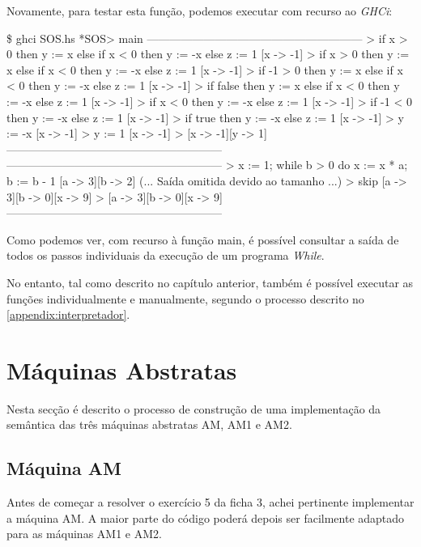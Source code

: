 \documentclass[11pt,a4paper]{report}
\newcommand{\while}[0]{\textit{While}\xspace}
\newcommand{\ghci}[0]{\textit{GHCi}\xspace}
\begin{document}
\par Novamente, para testar esta função, podemos executar com recurso ao \ghci:
\begin{mintedhaskell}{\$ ghci SOS.hs}
*SOS> main
---------------------------------------------------------
> if x > 0 then y := x else if x < 0 then y := -x else z := 1 [x -> -1]
> if x > 0 then {y := x} else {if x < 0 then {y := -x} else {z := 1}}
  [x -> -1]
> if -1 > 0 then {y := x} else {if x < 0 then {y := -x} else {z := 1}}
  [x -> -1]
> if false then {y := x} else {if x < 0 then {y := -x} else {z := 1}}
  [x -> -1]
> if x < 0 then {y := -x} else {z := 1}
  [x -> -1]
> if -1 < 0 then {y := -x} else {z := 1}
  [x -> -1]
> if true then {y := -x} else {z := 1}
  [x -> -1]
> y := -x
  [x -> -1]
> y := 1
  [x -> -1]
> [x -> -1][y -> 1]
---------------------------------------------------------
---------------------------------------------------------
> x := 1; while b > 0 do { x := x * a; b := b - 1 } [a -> 3][b -> 2]
(... Saída omitida devido ao tamanho ...)
> skip
  [a -> 3][b -> 0][x -> 9]
> [a -> 3][b -> 0][x -> 9]
---------------------------------------------------------
\end{mintedhaskell}

\par Como podemos ver, com recurso à função main, é possível consultar a saída de todos os passos individuais da execução de um programa \while.

\par No entanto, tal como descrito no capítulo anterior, também é possível executar as funções individualmente e manualmente, segundo o processo descrito no \autoref{appendix:interpretador}.

\chapter{Máquinas Abstratas} \label{chapter:maquinas-abstratas}

\par Nesta secção é descrito o processo de construção de uma implementação da semântica das três máquinas abstratas AM, AM1 e AM2.

\section{Máquina AM} \label{section:maquina-am}

\par Antes de começar a resolver o exercício 5 da ficha 3, achei pertinente implementar a máquina AM. A maior parte do código poderá depois ser facilmente adaptado para as máquinas AM1 e AM2.
\end{document}
